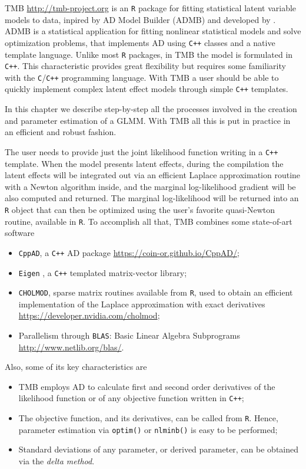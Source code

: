 TMB \url{ http://tmb-project.org} is an \texttt{R} \cite{R18} package
for fitting statistical latent variable models to data, inpired by AD
Model Builder (ADMB) and developed by . ADMB is a
statistical application for fitting nonlinear statistical models and
solve optimization problems, that implements AD using \texttt{C++}
classes and a native template language. Unlike most \texttt{R} packages,
in TMB the model is formulated in \texttt{C++}. This characteristic
provides great flexibility but requires some familiarity with the
\texttt{C}/\texttt{C++} programming language. With TMB a user should be
able to quickly implement complex latent effect models through simple
\texttt{C++} templates.

In this chapter we describe step-by-step all the processes involved in
the creation and parameter estimation of a GLMM. With TMB all this is
put in practice in an efficient and robust fashion.

The user needs to provide just the joint likelihood function writing in
a \texttt{C++} template. When the model presents latent effects, during
the compilation the latent effects will be integrated out via an
efficient Laplace approximation routine with a Newton algorithm inside,
and the marginal log-likelihood gradient will be also computed and
returned. The marginal log-likelihood will be returned into an
\texttt{R} object that can then be optimized using the user's favorite
quasi-Newton routine, available in \texttt{R}. To accomplish all that,
TMB combines some state-of-art software

\begin{itemize}
\item \texttt{CppAD}, a \texttt{C++} AD package
  \url{https://coin-or.github.io/CppAD/};
\item \texttt{Eigen} \cite{eigen}, a \texttt{C++} templated
  matrix-vector library;
\item \texttt{CHOLMOD}, sparse matrix routines available from
  \texttt{R}, used to obtain an efficient implementation of the Laplace
  approximation with exact derivatives
  \url{https://developer.nvidia.com/cholmod};
\item Parallelism through \texttt{BLAS}: Basic Linear Algebra
  Subprograms \url{http://www.netlib.org/blas/}.
\end{itemize}
Also, some of its key characteristics are
\begin{itemize}
\item TMB employs AD to calculate first and second order derivatives of
  the likelihood function or of any objective function written in
  \texttt{C++};
\item The objective function, and its derivatives, can be called from
  \texttt{R}. Hence, parameter estimation via \texttt{optim()} or
  \texttt{nlminb()} is easy to be performed;
\item Standard deviations of any parameter, or derived parameter, can be
  obtained via the \textit{delta method}.
\end{itemize}

